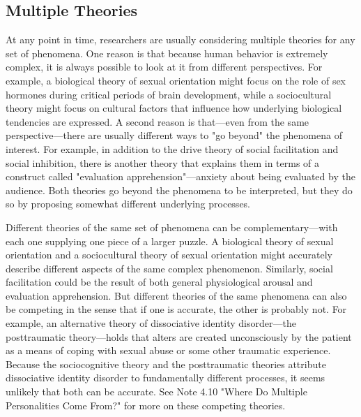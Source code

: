 \subsection{Multiple Theories}


At any point in time, researchers are usually considering multiple theories for any set of phenomena. One reason is that because human behavior is extremely complex, it is always possible to look at it from different perspectives. For example, a biological theory of sexual orientation might focus on the role of sex hormones during critical periods of brain development, while a sociocultural theory might focus on cultural factors that influence how underlying biological tendencies are expressed. A second reason is that---even from the same perspective---there are usually different ways to "go beyond" the phenomena of interest. For example, in addition to the drive theory of social facilitation and social inhibition, there is another theory that explains them in terms of a construct called "evaluation apprehension"---anxiety about being evaluated by the audience. Both theories go beyond the phenomena to be interpreted, but they do so by proposing somewhat different underlying processes.


Different theories of the same set of phenomena can be complementary---with each one supplying one piece of a larger puzzle. A biological theory of sexual orientation and a sociocultural theory of sexual orientation might accurately describe different aspects of the same complex phenomenon. Similarly, social facilitation could be the result of both general physiological arousal and evaluation apprehension. But different theories of the same phenomena can also be competing in the sense that if one is accurate, the other is probably not. For example, an alternative theory of dissociative identity disorder---the posttraumatic theory---holds that alters are created unconsciously by the patient as a means of coping with sexual abuse or some other traumatic experience. Because the sociocognitive theory and the posttraumatic theories attribute dissociative identity disorder to fundamentally different processes, it seems unlikely that both can be accurate. See Note 4.10 "Where Do Multiple Personalities Come From?" for more on these competing theories.



